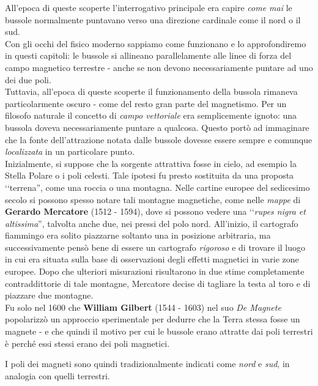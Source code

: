 \begin{digression}
	All'epoca di queste scoperte l'interrogativo principale era capire \textit{come mai} le bussole normalmente puntavano verso una direzione cardinale come il nord o il sud.\\
	Con gli occhi del fisico moderno sappiamo come funzionano e lo approfondiremo in questi capitoli: le bussole si allineano parallelamente alle linee di forza del campo magnetico terrestre - anche se non devono necessariamente puntare ad uno dei due poli.\\
	Tuttavia, all'epoca di queste scoperte il funzionamento della bussola rimaneva particolarmente oscuro - come del resto gran parte del magnetismo. Per un filosofo naturale il concetto di \textit{campo vettoriale} era semplicemente ignoto: una bussola doveva necessariamente puntare a qualcosa. Questo portò ad immaginare che la fonte dell'attrazione notata dalle bussole dovesse essere sempre e comunque \textit{localizzata} in un particolare punto.\\
	Inizialmente, si suppose che la sorgente attrattiva fosse in cielo, ad esempio la Stella Polare o i poli celesti. Tale ipotesi fu presto sostituita da una proposta ‘‘terrena'', come una roccia o una montagna. Nelle cartine europee del sedicesimo secolo si possono spesso notare tali montagne magnetiche, come nelle \textit{mappe} di \textbf{Gerardo Mercatore} (1512 - 1594), dove si possono vedere una ‘‘\textit{rupes nigra et altissima}'', talvolta anche due, nei pressi del polo nord.
	All'inizio, il cartografo fiammingo era solito piazzarne soltanto una in posizione arbitraria, ma successivamente pensò bene di essere un cartografo \textit{rigoroso} e di trovare il luogo in cui era situata sulla base di osservazioni degli effetti magnetici in varie zone europee. Dopo che ulteriori misurazioni risultarono in due stime completamente contraddittorie di tale montagne, Mercatore decise di tagliare la testa al toro e di piazzare due montagne.\\ %
	Fu solo nel 1600 che \textbf{William Gilbert} (1544 - 1603) nel suo \textit{De Magnete} popolarizzò un approccio sperimentale per dedurre che la Terra stessa fosse un magnete - e che quindi il motivo per cui le bussole erano attratte dai poli terrestri è perché essi stessi erano dei poli magnetici.
\end{digression}
I poli dei magneti sono quindi tradizionalmente indicati come \textit{nord} e \textit{sud}, in analogia con quelli terrestri.
